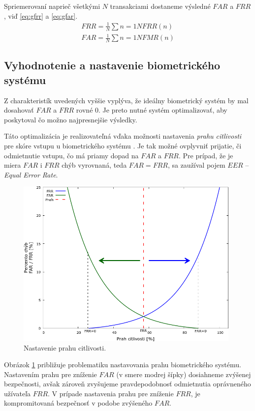 Spriemerovaní naprieč všetkými $N$ transakciami dostaneme výsledné $FAR$ a $FRR$, viď \ref{eq:gfrr} a \ref{eq:gfar}.
\begin{align}
FRR = \frac{1}{N}\sum{n=1}{N} FRR(n) \label{eq:gfrr} \\
FAR = \frac{1}{N}\sum{n=1}{N} FMR(n) \label{eq:gfar}
\end{align}

\subsection{Vyhodnotenie a nastavenie biometrického systému}
Z charakteristík uvedených vyššie vyplýva, že ideálny biometrický systém by mal dosahovať $FAR$ a $FRR$ rovné 0. Je preto nutné systém optimalizovať, aby poskytoval čo možno najpresnejšie výsledky. 

Táto optimalizácia je realizovateľná vďaka možnosti nastavenia \emph{prahu citlivosti} pre skóre vstupu u biometrického systému \cite{bio3}. Je tak možné ovplyvniť prijatie, či odmietnutie vstupu, čo má priamy dopad na $FAR$ a $FRR$. Pre prípad, že je miera $FAR$ i $FRR$ chýb vyrovnaná, teda $FAR = FRR$, sa zaužíval pojem $EER$ -- \emph{Equal Error Rate}.

\begin{figure}[!ht]
	\centering
	\includegraphics[width=11cm]{img/prah.png}
	\caption{Nastavenie prahu citlivosti\cite{bio3}.}
	\label{fig:prah}
\end{figure}

Obrázok \ref{fig:prah} približuje problematiku nastavovania prahu biometrického systému. Nastavením prahu pre zníženie $FAR$ (v smere modrej šípky) dosiahneme zvýšenej bezpečnosti, avšak zároveň zvyšujeme pravdepodobnosť odmietnutia oprávneného užívateľa $FRR$. V prípade nastavenia prahu pre zníženie $FRR$, je kompromitovaná bezpečnosť v podobe zvýšeného $FAR$.

